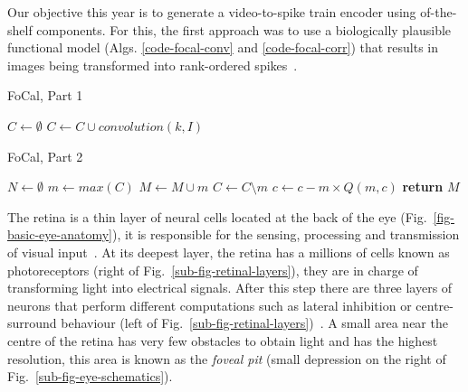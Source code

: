 Our objective this year 
is to generate a video-to-spike train encoder using of-the-shelf components. 
For this, the first approach was to use a biologically plausible functional 
model (Algs. \ref{code-focal-conv} and \ref{code-focal-corr}) that results in images being transformed into rank-ordered spikes~\cite{basab-model}.

\begin{algorithm}[h]
  \caption{FoCal, Part 1}
  \label{code-focal-conv}
  \begin{algorithmic}
      \State $C \leftarrow \emptyset$
        \State $C \leftarrow C \cup convolution(k, I)$
      \EndFor
    \EndProcedure
  \end{algorithmic}
\end{algorithm}
\begin{algorithm}[h]
  \caption{FoCal, Part 2}
  \label{code-focal-corr}
  \begin{algorithmic}
    \State $N \leftarrow \emptyset$ 
    \Repeat
    \State $m \leftarrow max(C)$
    \State $M \leftarrow M \cup m$
    \State $C \leftarrow C \setminus m$
     
     
    \State $c \leftarrow c - m \times Q(m, c)$
    \EndIf
    \EndFor
    \State \textbf{return} $M$
    \EndProcedure
  \end{algorithmic}
\end{algorithm}

The retina is a thin layer of neural cells located at the back of the eye 
(Fig.~\ref{fig-basic-eye-anatomy}), it is responsible
for the sensing, processing and transmission of visual input~\cite{webvision}. 
At its deepest layer, the retina has a millions of cells known as 
photoreceptors (right of Fig.~\ref{sub-fig-retinal-layers}), they are in charge 
of transforming light into electrical signals. After this step there are three 
layers of neurons that perform different computations such as lateral 
inhibition or centre-surround behaviour (left of 
Fig.~\ref{sub-fig-retinal-layers})~\cite{webvision}. A small area near the 
centre of the retina has very few 
obstacles to obtain light and has the highest resolution, this area is known as the \emph{foveal pit} (small depression on the right of 
Fig.~\ref{sub-fig-eye-schematics}).

